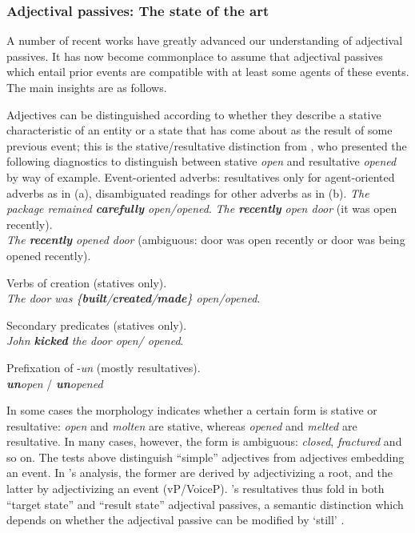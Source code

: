       \subsubsection{Adjectival passives: The state of the art}
A number of recent works have greatly advanced our understanding of adjectival passives. It has now become commonplace to assume that adjectival passives which entail prior events are compatible with at least some agents of these events. The main insights are as follows.

Adjectives can be distinguished according to whether they describe a stative characteristic of an entity or a state that has come about as the result of some previous event; this is the stative/resultative distinction from \cite{embick04li}, who presented the following diagnostics to distinguish between stative \emph{open} and resultative \emph{opened} by way of example.
\pex Event-oriented adverbs: resultatives only for agent-oriented adverbs as in (a), disambiguated readings for other adverbs as in (b).
	\a \emph{The package remained \textbf{carefully} \xmark open/\cmark opened}.
	\a \emph{The \textbf{recently} open door} (it was open recently).\\
		\emph{The \textbf{recently} opened door} (ambiguous: door was open recently or door was being opened recently).
\xe

\ex Verbs of creation (statives only).\\
	\emph{The door was \{\textbf{built}/\textbf{created}/\textbf{made}\} \cmark open/\xmark opened}.
\xe

\ex Secondary predicates (statives only).\\
	\emph{John \textbf{kicked} the door \cmark open/ \xmark opened}.
\xe

\ex Prefixation of -\emph{un} (mostly resultatives).\\
	\xmark \emph{\textbf{un}open} / \cmark \emph{\textbf{un}opened}
\xe

In some cases the morphology indicates whether a certain form is stative or resultative: \emph{open} and \emph{molten} are stative, whereas \emph{opened} and \emph{melted} are resultative. In many cases, however, the form is ambiguous: \emph{closed}, \emph{fractured} and so on. The tests above distinguish ``simple'' adjectives from adjectives embedding an event. In \citeauthor{embick04li}'s analysis, the former are derived by adjectivizing a root, and the latter by adjectivizing an event (vP/VoiceP). \citeauthor{embick04li}'s resultatives thus fold in both ``target state'' and ``result state'' adjectival passives, a semantic distinction which depends on whether the adjectival passive can be modified by `still' \citep{kratzer00bls,alexiadouetal14}.


